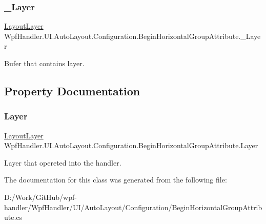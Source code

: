 \subsubsection{\texorpdfstring{\+\_\+\+Layer}{\_Layer}}
{\footnotesize\ttfamily \mbox{\hyperlink{class_wpf_handler_1_1_u_i_1_1_auto_layout_1_1_layout_layer}{Layout\+Layer}} Wpf\+Handler.\+U\+I.\+Auto\+Layout.\+Configuration.\+Begin\+Horizontal\+Group\+Attribute.\+\_\+\+Layer\hspace{0.3cm}{\ttfamily [private]}}



Bufer that contains layer. 



\subsection{Property Documentation}
\mbox{\label{class_wpf_handler_1_1_u_i_1_1_auto_layout_1_1_configuration_1_1_begin_horizontal_group_attribute_afbdce9f3ac40b7f4bd6f2f675beafe36}} 
\subsubsection{\texorpdfstring{Layer}{Layer}}
{\footnotesize\ttfamily \mbox{\hyperlink{class_wpf_handler_1_1_u_i_1_1_auto_layout_1_1_layout_layer}{Layout\+Layer}} Wpf\+Handler.\+U\+I.\+Auto\+Layout.\+Configuration.\+Begin\+Horizontal\+Group\+Attribute.\+Layer\hspace{0.3cm}{\ttfamily [get]}}



Layer that opereted into the handler. 



The documentation for this class was generated from the following file\+:\begin{DoxyCompactItemize}
\item 
D\+:/\+Work/\+Git\+Hub/wpf-\/handler/\+Wpf\+Handler/\+U\+I/\+Auto\+Layout/\+Configuration/Begin\+Horizontal\+Group\+Attribute.\+cs\end{DoxyCompactItemize}
